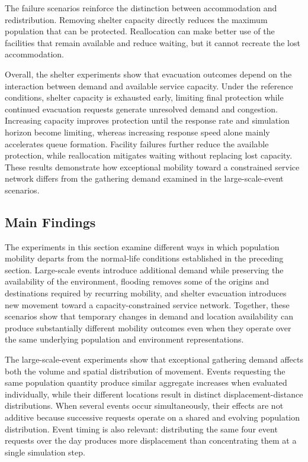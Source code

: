 The failure scenarios reinforce the distinction between accommodation and redistribution. Removing shelter capacity directly reduces the maximum population that can be protected. Reallocation can make better use of the facilities that remain available and reduce waiting, but it cannot recreate the lost accommodation.

Overall, the shelter experiments show that evacuation outcomes depend on the interaction between demand and available service capacity. Under the reference conditions, shelter capacity is exhausted early, limiting final protection while continued evacuation requests generate unresolved demand and congestion. Increasing capacity improves protection until the response rate and simulation horizon become limiting, whereas increasing response speed alone mainly accelerates queue formation. Facility failures further reduce the available protection, while reallocation mitigates waiting without replacing lost capacity. These results demonstrate how exceptional mobility toward a constrained service network differs from the gathering demand examined in the large-scale-event scenarios.





\subsection{Main Findings}
\label{sec:exceptional_disruption_findings}

The experiments in this section examine different ways in which population mobility departs from the normal-life conditions established in the preceding section. Large-scale events introduce additional demand while preserving the availability of the environment, flooding removes some of the origins and destinations required by recurring mobility, and shelter evacuation introduces new movement toward a capacity-constrained service network. Together, these scenarios show that temporary changes in demand and location availability can produce substantially different mobility outcomes even when they operate over the same underlying population and environment representations.

The large-scale-event experiments show that exceptional gathering demand affects both the volume and spatial distribution of movement. Events requesting the same population quantity produce similar aggregate increases when evaluated individually, while their different locations result in distinct displacement-distance distributions. When several events occur simultaneously, their effects are not additive because successive requests operate on a shared and evolving population distribution. Event timing is also relevant: distributing the same four event requests over the day produces more displacement than concentrating them at a single simulation step.

